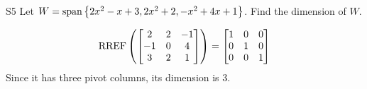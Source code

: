 \begin{problem}{S5}
  Let \(
    W={\rm span}\left\{ 2x^2-x+3, 2x^2+2, -x^2+4x+1 \right\}\).
  Find the dimension of \(W\).
\end{problem}
\begin{solution}
  \[\operatorname{RREF}\left(
    \begin{bmatrix}
      2 & 2 & -1 \\
      -1 & 0 & 4 \\
      3 & 2 & 1
    \end{bmatrix} \right)= \begin{bmatrix}
      1 & 0 &0 \\
      0 & 1 & 0 \\
      0 & 0 & 1
    \end{bmatrix}
  \]
  Since it has three pivot columns, its dimension is \(3\).
\end{solution}
